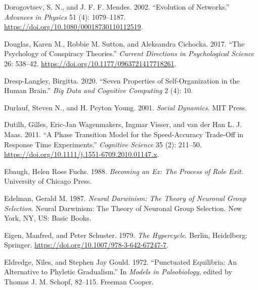 \documentclass[
  a4paper,
  DIV=11,
  numbers=noendperiod,
  oneside]{scrreprt}
\newlength{\cslhangindent}
\newlength{\cslentryspacingunit} %
\newenvironment{CSLReferences}[2] %
 {%
  \setlength{\parindent}{0pt}
  \ifodd #1
  \let\oldpar\par
  \def\par{\hangindent=\cslhangindent\oldpar}
  \fi
  \setlength{\parskip}{#2\cslentryspacingunit}
 }%
 {}
\begin{document}
\begin{CSLReferences}{1}{0}
\leavevmode{}%
Dorogovtsev, S. N., and J. F. F. Mendes. 2002. {``Evolution of
Networks.''} \emph{Advances in Physics} 51 (4): 1079--1187.
\url{https://doi.org/10.1080/00018730110112519}.

\leavevmode{}%
Douglas, Karen M., Robbie M. Sutton, and Aleksandra Cichocka. 2017.
{``The Psychology of Conspiracy Theories.''} \emph{Current Directions in
Psychological Science} 26: 538--42.
\url{https://doi.org/10.1177/0963721417718261}.

\leavevmode{}%
Dresp-Langley, Birgitta. 2020. {``Seven {Properties} of
{Self-Organization} in the {Human Brain}.''} \emph{Big Data and
Cognitive Computing} 2 (4): 10.

\leavevmode{}%
Durlauf, Steven N., and H. Peyton Young. 2001. \emph{Social {Dynamics}}.
{MIT Press}.

\leavevmode{}%
Dutilh, Gilles, Eric-Jan Wagenmakers, Ingmar Visser, and van der Han L.
J. Maas. 2011. {``A {Phase Transition Model} for the {Speed-Accuracy
Trade-Off} in {Response Time Experiments}.''} \emph{Cognitive Science}
35 (2): 211--50. \url{https://doi.org/10.1111/j.1551-6709.2010.01147.x}.

\leavevmode{}%
Ebaugh, Helen Rose Fuchs. 1988. \emph{Becoming an Ex: The Process of
Role Exit}. University of Chicago Press.

\leavevmode{}%
Edelman, Gerald M. 1987. \emph{Neural {Darwinism}: {The} Theory of
Neuronal Group Selection}. Neural {Darwinism}: {The} Theory of Neuronal
Group Selection. {New York, NY, US}: {Basic Books}.

\leavevmode{}%
Eigen, Manfred, and Peter Schuster. 1979. \emph{The {Hypercycle}}.
{Berlin, Heidelberg}: {Springer}.
\url{https://doi.org/10.1007/978-3-642-67247-7}.

\leavevmode{}%
Eldredge, Niles, and Stephen Jay Gould. 1972. {``Punctuated
{Equilibria}: {An Alternative} to {Phyletic Gradualism}.''} In
\emph{Models in {Paleobiology}}, edited by Thomas J. M. Schopf, 82--115.
{Freeman Cooper}.


\end{CSLReferences}
\end{document}
